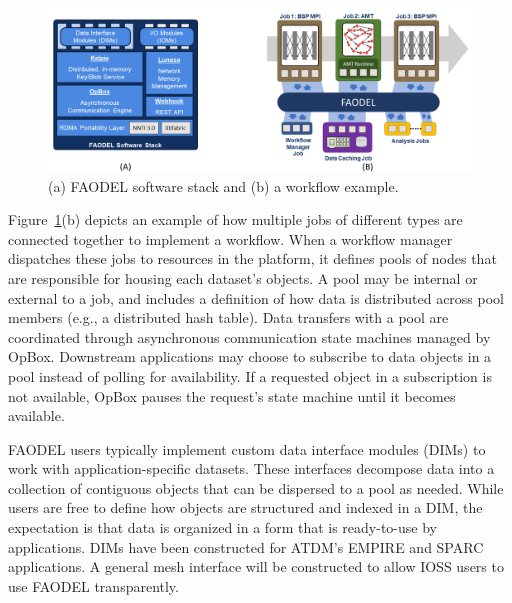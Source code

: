 \begin{figure}[htb]
	\centering
	\includegraphics[width=6in]{projects/2.3.4-DataViz/2.3.4.04-SNL-ATDM-DataViz/faodel-diagram}
	\caption{\label{fig:faodel-diagram}(a) FAODEL software stack and (b) a workflow example.}
\end{figure}


Figure~\ref{fig:faodel-diagram}(b) depicts an example of how multiple jobs of different types are connected together to implement a workflow. When a workflow manager dispatches these jobs to resources in the platform, it defines pools of nodes that are responsible for housing each dataset's objects. A pool may be internal or external to a job, and includes a definition of how data is distributed across pool members (e.g., a distributed hash table). Data transfers with a pool are coordinated through asynchronous communication state machines managed by OpBox. Downstream applications may choose to subscribe to data objects in a pool instead of polling for availability. If a requested object in a subscription is not available, OpBox pauses the request's state machine until it becomes available.

FAODEL users typically implement custom data interface modules (DIMs) to work with application-specific datasets. These interfaces decompose data into a collection of contiguous objects that can be dispersed to a pool as needed. While users are free to define how objects are structured and indexed in a DIM, the expectation is that data is organized in a form that is ready-to-use by applications. DIMs have been constructed for ATDM's EMPIRE and SPARC applications. A general mesh interface will be constructed to allow IOSS users to use FAODEL transparently.

